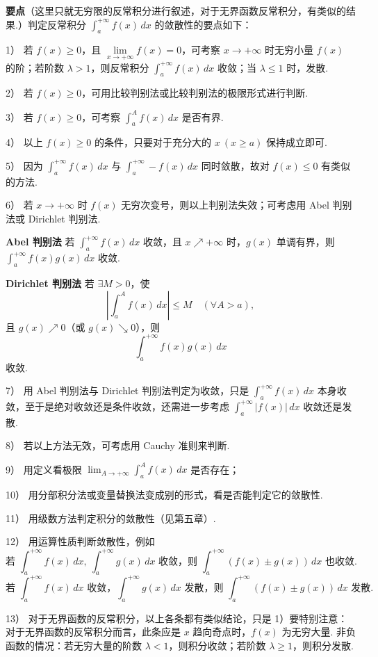 \documentclass[UTF8, 12pt, fontset=fandol, oneside]{ctexart}
\begin{document}
\noindent\textbf{要点}\quad （这里只就无穷限的反常积分进行叙述，对于无界函数反常积分，有类似的结果.）判定反常积分 $\displaystyle\int_a^{+\infty}f(x)\,dx$ 的敛散性的要点如下：

1） 若 $f(x)\ge0$，且 $\lim\limits_{x\to+\infty}f(x)=0$，可考察 $x\to+\infty$ 时无穷小量 $f(x)$ 的阶；若阶数 $\lambda>1$，则反常积分 $\displaystyle\int_a^{+\infty}f(x)\,dx$ 收敛；当 $\lambda\le1$ 时，发散.

2） 若 $f(x)\ge0$，可用比较判别法或比较判别法的极限形式进行判断.

3） 若 $f(x)\ge0$，可考察 $\displaystyle\int_a^A f(x)\,dx$ 是否有界.

4） 以上 $f(x)\ge0$ 的条件，只要对于充分大的 $x\ (x\ge a)$ 保持成立即可.

5） 因为 $\displaystyle\int_a^{+\infty} f(x)\,dx$ 与 $\displaystyle\int_a^{+\infty}-f(x)\,dx$ 同时敛散，故对 $f(x)\le0$ 有类似的方法.

6） 若 $x\to+\infty$ 时 $f(x)$ 无穷次变号，则以上判别法失效；可考虑用 Abel 判别法或 Dirichlet 判别法.

\noindent\textbf{Abel 判别法}\quad
若 $\displaystyle\int_a^{+\infty}f(x)\,dx$ 收敛，且 $x\nearrow+\infty$ 时，$g(x)$ 单调有界，则 $\displaystyle\int_a^{+\infty}f(x)g(x)\,dx$ 收敛.

\noindent\textbf{Dirichlet 判别法}\quad
若 $\exists M>0$，使
\[
\left|\int_a^A f(x)\,dx\right|\le M\quad(\forall A>a),
\]
且 $g(x)\nearrow0$（或 $g(x)\searrow0$），则
\[
\int_a^{+\infty}f(x)g(x)\,dx
\]
收敛.

7） 用 Abel 判别法与 Dirichlet 判别法判定为收敛，只是 $\displaystyle\int_a^{+\infty}f(x)\,dx$ 本身收敛，至于是绝对收敛还是条件收敛，还需进一步考虑 $\displaystyle\int_a^{+\infty}|f(x)|\,dx$ 收敛还是发散.

8） 若以上方法无效，可考虑用 Cauchy 准则来判断.

9） 用定义看极限 $\displaystyle\lim_{A\to+\infty}\int_a^A f(x)\,dx$ 是否存在；

10） 用分部积分法或变量替换法变成别的形式，看是否能判定它的敛散性.

11） 用级数方法判定积分的敛散性（见第五章）.

12） 用运算性质判断敛散性，例如
\[
\text{若 }\int_a^{+\infty}f(x)\,dx,\ \int_a^{+\infty}g(x)\,dx\text{ 收敛，则 }
\int_a^{+\infty}(f(x)\pm g(x))\,dx\text{ 也收敛.}
\]
\[
\text{若 }\int_a^{+\infty}f(x)\,dx\text{ 收敛，}\int_a^{+\infty}g(x)\,dx\text{ 发散，则 }
\int_a^{+\infty}(f(x)\pm g(x))\,dx\text{ 发散.}
\]

13） 对于无界函数的反常积分，以上各条都有类似结论，只是 1）要特别注意：对于无界函数的反常积分而言，此条应是 $x$ 趋向奇点时，$f(x)$ 为无穷大量. 非负函数的情况：若无穷大量的阶数 $\lambda<1$，则积分收敛；若阶数 $\lambda\ge1$，则积分发散.
\end{document}
